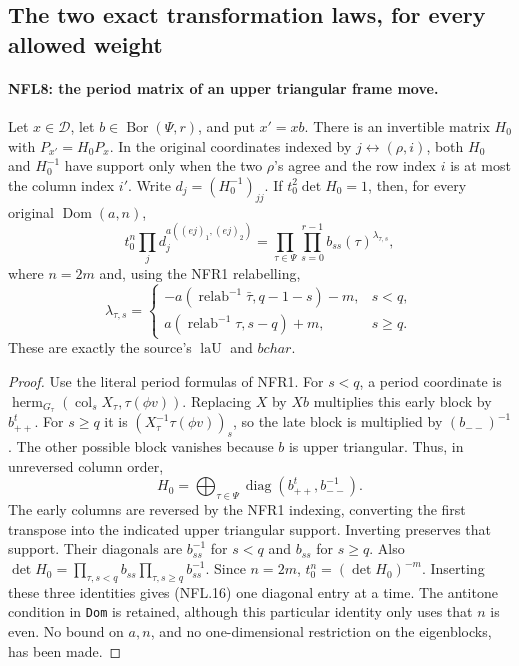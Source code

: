 \subsection{The two exact transformation laws, for every allowed weight}

\paragraph{NFL8: the period matrix of an upper triangular frame move.}
\label{claim:NFL8}
Let $x\in\mathcal D$, let $b\in\operatorname{Bor}(\Psi,r)$, and
put $x'=xb$.  There is an invertible matrix $H_0$ with
$P_{x'}=H_0P_x$.  In the original coordinates indexed by
$j\leftrightarrow(\rho,i)$, both $H_0$ and $H_0^{-1}$ have support
only when the two $\rho$'s agree and the row index $i$ is at most
the column index $i'$.  Write $d_j=(H_0^{-1})_{jj}$.
If $t_0^2\det H_0=1$, then, for every original $\operatorname{Dom}(a,n)$,
\[
 t_0^n\prod_jd_j^{a((ej)_1,(ej)_2)}
       =\prod_{\tau\in\Psi}\prod_{s=0}^{r-1}
                       b_{ss}(\tau)^{\lambda_{\tau,s}},
 \tag{NFL.16}
\]
where $n=2m$ and, using the NFR1 relabelling,
\[
 \lambda_{\tau,s}=
 \begin{cases}
 -a(\operatorname{relab}^{-1}\bar\tau,q-1-s)-m,&s<q,\\
 a(\operatorname{relab}^{-1}\tau,s-q)+m,&s\ge q.
 \end{cases}
 \tag{NFL.17}
\]
These are exactly the source's $\operatorname{laU}$ and $bchar$.

\begin{proof}
Use the literal period formulas of NFR1.  For $s<q$, a period
coordinate is $\operatorname{herm}_{G_\tau}(\operatorname{col}_sX_\tau,
\tau(\phi v))$.  Replacing $X$ by $Xb$ multiplies this early
block by $b_{++}^t$.  For $s\ge q$ it is
$(X_\tau^{-1}\tau(\phi v))_s$, so the late block is multiplied
by $(b_{--})^{-1}$.  The other possible block vanishes because
$b$ is upper triangular.  Thus, in unreversed column order,
\[
 H_0=\bigoplus_{\tau\in\Psi}
            \operatorname{diag}(b_{++}^t,b_{--}^{-1}).
 \tag{NFL.18}
\]
The early columns are reversed by the NFR1 indexing, converting
the first transpose into the indicated upper triangular support.
Inverting preserves that support.  Their diagonals are
$b_{ss}^{-1}$ for $s<q$ and $b_{ss}$ for $s\ge q$.
Also $\det H_0=\prod_{\tau,s<q}b_{ss}
\prod_{\tau,s\ge q}b_{ss}^{-1}$.
Since $n=2m$, $t_0^n=(\det H_0)^{-m}$.  Inserting these three
identities gives (NFL.16) one diagonal entry at a time.
The antitone condition in \texttt{Dom} is retained, although this
particular identity only uses that $n$ is even.  No bound on
$a,n$, and no one-dimensional restriction on the eigenblocks,
has been made.
\end{proof}

